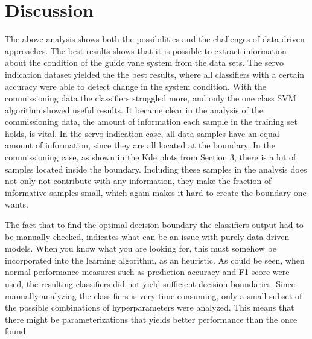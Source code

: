 \section{Discussion}
    
    The above analysis shows both the possibilities and the challenges of data-driven approaches. The best results shows that it is possible to extract information about the condition of the guide vane system from the data sets. The servo indication dataset yielded the the best results, where all classifiers with a certain accuracy were able to detect change in the system condition. With the commissioning data the classifiers struggled more, and only the one class SVM algorithm showed useful results. It became clear in the analysis of the commissioning data, the amount of information each sample in the training set holds, is vital. In the servo indication case, all data samples have an equal amount of information, since they are all located at the boundary. In the commissioning case, as shown in the Kde plots from Section 3, there is a lot of samples located inside the boundary. Including these samples in the analysis does not only not contribute with any information, they make the fraction of informative samples small, which again makes it hard to create the boundary one wants.   
     
    
    The fact that to find the optimal decision boundary the classifiers output had to be manually checked, indicates what can be an issue with purely data driven models. When you know what you are looking for, this must somehow be incorporated into the learning algorithm, as an heuristic. As could be seen, when normal performance measures such as prediction accuracy and F1-score were used, the resulting classifiers did not yield sufficient decision boundaries. Since manually analyzing the classifiers is very time consuming, only a small subset of the possible  combinations of hyperparameters were analyzed. This means that there might be parameterizations that yields better performance than the once found. 
    
